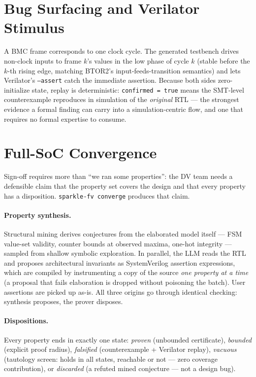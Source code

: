 \documentclass[11pt]{article}
\begin{document}
\section{Bug Surfacing and Verilator Stimulus}\label{sec:cex}

A BMC frame corresponds to one clock cycle. The generated testbench drives
non-clock inputs to frame $k$'s values in the low phase of cycle $k$
(stable before the $k$-th rising edge, matching BTOR2's
input-feeds-transition semantics) and lets Verilator's \texttt{--assert}
catch the immediate assertion. Because both sides zero-initialize state,
replay is deterministic: \texttt{confirmed = true} means the SMT-level
counterexample reproduces in simulation of the \emph{original} RTL --- the
strongest evidence a formal finding can carry into a simulation-centric
flow, and one that requires no formal expertise to consume.

\section{Full-SoC Convergence}\label{sec:convergence}

Sign-off requires more than ``we ran some properties'': the DV team needs a
defensible claim that the property set covers the design and that every
property has a disposition. \texttt{sparkle-fv converge} produces that claim.

\paragraph{Property synthesis.} Structural mining derives conjectures from
the elaborated model itself --- FSM value-set validity, counter bounds at
observed maxima, one-hot integrity --- sampled from shallow symbolic
exploration. In parallel, the LLM reads the RTL and proposes architectural
invariants as SystemVerilog assertion expressions, which are compiled by
instrumenting a copy of the source \emph{one property at a time} (a proposal
that fails elaboration is dropped without poisoning the batch). User
assertions are picked up as-is. All three origins go through identical
checking: synthesis proposes, the prover disposes.

\paragraph{Dispositions.} Every property ends in exactly one state:
\emph{proven} (unbounded certificate), \emph{bounded} (explicit proof
radius), \emph{falsified} (counterexample + Verilator replay),
\emph{vacuous} (tautology screen: holds in all states, reachable or not ---
zero coverage contribution), or \emph{discarded} (a refuted mined
conjecture --- not a design bug).
\end{document}
